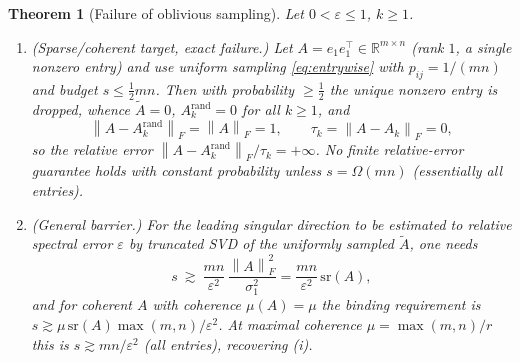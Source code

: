 \documentclass{amsart}
\newtheorem{theorem}{Theorem}
\theoremstyle{definition}
\newcommand{\R}{\mathbb{R}}
\newcommand{\Frob}[1]{\left\lVert #1\right\rVert_F}
\newcommand{\Atil}{\widetilde{A}}
\begin{document}
\begin{theorem}[Failure of oblivious sampling]\label{thm:fail}
Let $0<\varepsilon\le1$, $k\ge1$.
\begin{enumerate}
\item[(i)] \emph{(Sparse/coherent target, exact failure.)} Let $A=e_1e_1^\top\in\R^{m\times n}$
(rank $1$, a single nonzero entry) and use uniform sampling
\eqref{eq:entrywise} with $p_{ij}=1/(mn)$ and budget $s\le\tfrac12mn$. Then with
probability $\ge\tfrac12$ the unique nonzero entry is dropped, whence
$\Atil=0$, $A_k^{\mathrm{rand}}=0$ for all $k\ge1$, and
\[
\Frob{A-A_k^{\mathrm{rand}}}=\Frob{A}=1,\qquad \tau_k=\Frob{A-A_k}=0,
\]
so the relative error $\Frob{A-A_k^{\mathrm{rand}}}/\tau_k=+\infty$. No finite
relative-error guarantee holds with constant probability unless
$s=\Omega(mn)$ (essentially all entries).
\item[(ii)] \emph{(General barrier.)} For the leading singular direction to be
estimated to relative spectral error $\varepsilon$ by truncated SVD of the
uniformly sampled $\Atil$, one needs
\begin{equation}\label{eq:barrier}
s\ \gtrsim\ \frac{mn}{\varepsilon^2}\,\frac{\Frob{A}^2}{\sigma_1^2}
=\frac{mn}{\varepsilon^2}\,\mathrm{sr}(A),
\end{equation}
and for coherent $A$ with coherence $\mu(A)=\mu$ the binding requirement is
$s\gtrsim \mu\,\mathrm{sr}(A)\max(m,n)/\varepsilon^2$. At maximal coherence
$\mu=\max(m,n)/r$ this is $s\gtrsim mn/\varepsilon^2$ (all entries), recovering
(i).
\end{enumerate}
\end{theorem}
\end{document}
